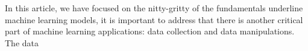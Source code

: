 In this article, we have focused on the nitty-gritty of the fundamentals underline machine learning models, it is important to address that there is another critical part of machine learning applications: data collection and data manipulations. The data  